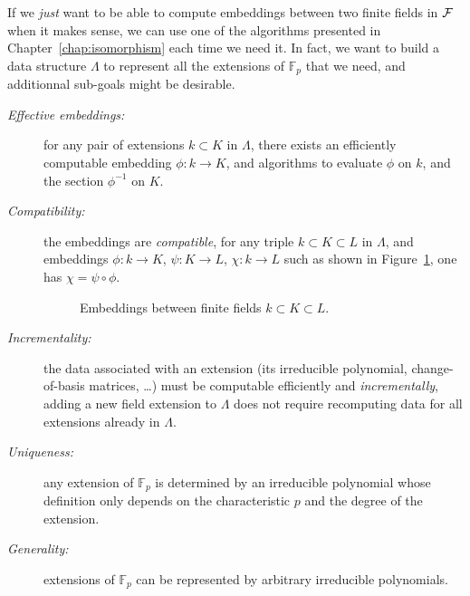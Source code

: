 If we \emph{just} want to be able to compute embeddings between two finite
fields in $\mathcal{F}$ when it makes sense, we can use one of the algorithms presented
in Chapter~\ref{chap:isomorphism} each time we need it. In fact, we want to
build a data structure $\Lambda$ to represent all the extensions of
$\mathbb{F}_p$ that we need, and additionnal sub-goals might be desirable.
\begin{description}
\item[\emph{Effective embeddings:}] for any pair of extensions
  $k\subset K$ in $\Lambda$, there exists an efficiently computable
  embedding $\phi:k\to K$, and algorithms to evaluate $\phi$ on $k$,
  and the section $\phi^{-1}$ on $K$.
\item[\emph{Compatibility:}] the embeddings are \emph{compatible},
  \ie for any triple $k\subset K\subset L$ in $\Lambda$, and
  embeddings $\phi:k\to K$, $\psi:K\to L$, $\chi:k\to L$ such as shown in
  Figure~\ref{fig:compatibility}, one has
  $\chi=\psi\circ\phi$.
  \begin{figure}[h]
    \centering

  \caption{Embeddings between finite fields $k\subset K\subset L$.}
  \label{fig:compatibility}
  \end{figure}
\item[\emph{Incrementality:}] the data associated with an extension
  (\eg its irreducible polynomial, change-of-basis matrices, \dots)
  must be computable efficiently and \emph{incrementally}, \ie 
  adding a new field extension to $\Lambda$ does not require
  recomputing data for all extensions already in $\Lambda$.
\item[\emph{Uniqueness:}] any extension of $\mathbb{F}_{p}$ is determined by an
  irreducible polynomial whose definition only depends on the
  characteristic $p$ and the degree of the extension.
\item[\emph{Generality:}] extensions of $\mathbb{F}_{p}$ can be represented by
  arbitrary irreducible polynomials.
\end{description}
